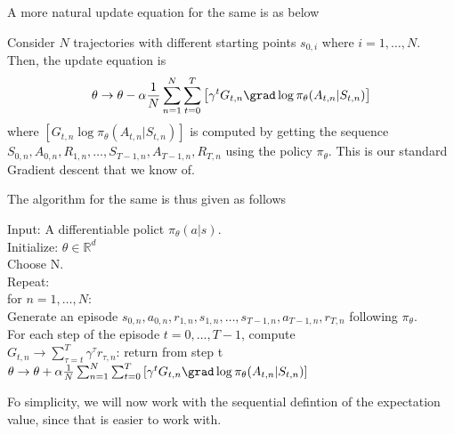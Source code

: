 \begin{tcolorbox}[title=Wikipedia algorithm,breakable ]
A more natural update equation for the same is as below~\cite{wiki:Policy_gradient_method}
\begin{tcolorbox}[title= Update equation,breakable]
    Consider $N$ trajectories with different starting points $s_{0,i}$ where $i=1,\ldots,N$. Then, the update equation is 
    \begin{align}
        \theta \rightarrow \theta - \alpha \frac{1}{N}\sum^N_{n=1} \sum^{T}_{t=0}\left[ \gamma^t G_{t,n} \grad\log{\pi_\theta(A_{t,n}|S_{t,n})}\right]
    \end{align}    
    where $\left[ G_{t,n} \log{\pi_\theta(A_{t,n}|S_{t,n})}\right]$ is computed by getting the sequence $S_{0,n},A_{0,n},R_{1,n},\ldots,S_{T-1,n},A_{T-1,n}, R_{T,n}$ using the policy $\pi_{\theta}$. This is our standard Gradient descent that we know of.  
\end{tcolorbox}
The algorithm for the same is thus given as follows
\begin{tcolorbox}[title = Algorithm,breakable]
    Input: A differentiable polict $\pi_{\theta}(a|s)$.\\
    Initialize: $\theta \in \mathds{R}^d$\\
    Choose N. \\
    Repeat:\\
    \null\quad for $n = 1,\ldots,N$:\\
    \null\quad\quad Generate an episode $s_{0,n},a_{0,n},r_{1,n},s_{1,n},\ldots,s_{T-1,n},a_{T-1,n},r_{T,n}$ following $\pi_{\theta}$.    \\
    \null\quad\quad For each step of the episode $t=0,\ldots,T-1$, compute \\
    \null\quad\quad$G_{t,n}\rightarrow \sum^{T}_{\tau=t} \gamma^\tau r_{\tau,n} $: return from step t \\
    \null\quad$\theta \rightarrow \theta  + \alpha \frac{1}{N}\sum^N_{n=1} \sum^{T}_{t=0}\left[ \gamma^t G_{t,n} \grad\log{\pi_\theta(A_{t,n}|S_{t,n})}\right]$
\end{tcolorbox}
    
\end{tcolorbox}
Fo simplicity, we will now work with the sequential defintion of the expectation value, since that is easier to work with.
